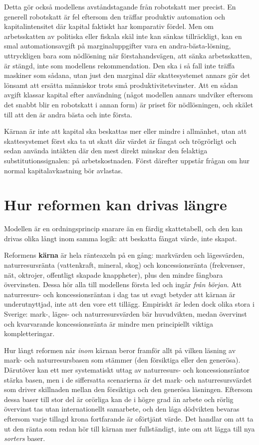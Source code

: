 \documentclass[11pt]{article}
\begin{document}
Detta gör också modellens avståndstagande från robotskatt mer precist. En generell robotskatt är fel eftersom den träffar produktiv automation och kapitalintensitet där kapital faktiskt har komparativ fördel. Men om arbetsskatten av politiska eller fiskala skäl inte kan sänkas tillräckligt, kan en smal automationsavgift på marginaluppgifter vara en andra-bästa-lösning, uttryckligen bara som nödlösning när förstahandsvägen, att sänka arbetsskatten, är stängd, inte som modellens rekommendation. Den ska i så fall inte träffa maskiner som sådana, utan just den marginal där skattesystemet annars gör det lönsamt att ersätta människor trots små produktivitetsvinster. Att en sådan avgift klassar kapital efter användning (något modellen annars undviker eftersom det snabbt blir en robotskatt i annan form) är priset för nödlösningen, och skälet till att den är andra bästa och inte första.

Kärnan är inte att kapital ska beskattas mer eller mindre i allmänhet, utan att skattesystemet först ska ta ut skatt där värdet är fångat och trögrörligt och sedan använda intäkten där den mest direkt minskar den felaktiga substitutionssignalen: på arbetskostnaden. Först därefter uppstår frågan om hur normal kapitalavkastning bör avlastas.

\section{Hur reformen kan drivas längre}

Modellen är en ordningsprincip snarare än en färdig skattetabell, och den kan drivas olika långt inom samma logik: att beskatta fångat värde, inte skapat.

Reformens \textbf{kärna} är hela ränteaxeln på en gång: markvärden och lägesvärden, naturresursränta (vattenkraft, mineral, skog) och koncessionsränta (frekvenser, nät, oktrojer, offentligt skapade knappheter), plus den mindre fångbara övervinsten. Dessa hör alla till modellens första led och ingår \emph{från början}. Att naturresurs- och koncessionsräntan i dag tas ut svagt betyder att kärnan är underutnyttjad, inte att den vore ett tillägg. Empiriskt är leden dock olika stora i Sverige: mark-, läges- och naturresursvärden bär huvudvikten, medan övervinst och kvarvarande koncessionsränta är mindre men principiellt viktiga kompletteringar.

Hur långt reformen når \emph{inom} kärnan beror framför allt på vilken läsning av mark- och naturresursbasen som stämmer (den försiktiga eller den generösa). Därutöver kan ett mer systematiskt uttag av naturresurs- och koncessionsräntor stärka basen, men i de siffersatta scenarierna är det mark- och naturresursvärdet som driver skillnaden mellan den försiktiga och den generösa läsningen. Eftersom dessa baser till stor del är orörliga kan de i högre grad än arbete och rörlig övervinst tas utan internationellt samarbete, och den låga dödvikten bevaras eftersom varje tillagd krona fortfarande är oförtjänt värde. Det handlar om att ta ut den ränta som redan hör till kärnan mer fullständigt, inte om att lägga till nya \emph{sorters} baser.
\end{document}
